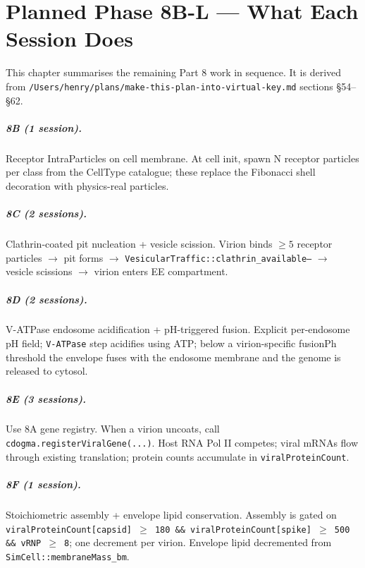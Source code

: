 \documentclass[11pt,letterpaper,twoside,openany]{book}
\newcommand{\code}[1]{\texttt{#1}}
\newcommand{\file}[1]{\texttt{\small#1}}
\begin{document}
\chapter{Planned Phase 8B-L --- What Each Session Does}
\label{ch:phase8-roadmap}

This chapter summarises the remaining Part 8 work in sequence. It
is derived from \file{/Users/henry/plans/make-this-plan-into-virtual-key.md}
sections \S54--\S62.

\paragraph{8B (1 session).} Receptor IntraParticles on cell membrane.
At cell init, spawn N receptor particles per class from the
CellType catalogue; these replace the Fibonacci shell decoration
with physics-real particles.

\paragraph{8C (2 sessions).} Clathrin-coated pit nucleation +
vesicle scission. Virion binds $\geq 5$ receptor particles $\to$
pit forms $\to$ \code{VesicularTraffic::clathrin\_available--}
$\to$ vesicle scissions $\to$ virion enters EE compartment.

\paragraph{8D (2 sessions).} V-ATPase endosome acidification
+ pH-triggered fusion. Explicit per-endosome pH field;
\code{V-ATPase} step acidifies using ATP; below a virion-specific
fusionPh threshold the envelope fuses with the endosome membrane
and the genome is released to cytosol.

\paragraph{8E (3 sessions).} Use 8A gene registry. When a virion
uncoats, call \code{cdogma.registerViralGene(...)}. Host RNA Pol II
competes; viral mRNAs flow through existing translation; protein
counts accumulate in \code{viralProteinCount}.

\paragraph{8F (1 session).} Stoichiometric assembly + envelope
lipid conservation. Assembly is gated on
\code{viralProteinCount[capsid] $\geq$ 180 \&\&
viralProteinCount[spike] $\geq$ 500 \&\& vRNP $\geq$ 8}; one
decrement per virion. Envelope lipid decremented from
\code{SimCell::membraneMass\_bm}.
\end{document}

